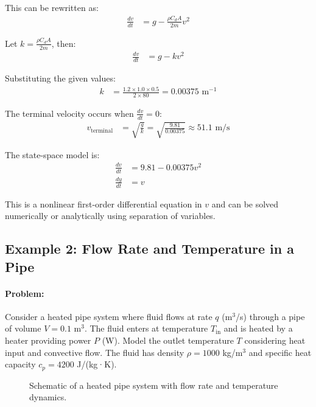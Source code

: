 \documentclass[11pt,a4paper]{article}
\begin{document}
This can be rewritten as:
\begin{align}
  \frac{dv}{dt} &= g - \frac{\rho C_d A}{2m} v^2
\end{align}

Let $k = \frac{\rho C_d A}{2m}$, then:
\begin{align}
  \frac{dv}{dt} &= g - kv^2
\end{align}

Substituting the given values:
\begin{align}
  k &= \frac{1.2 \times 1.0 \times 0.5}{2 \times 80} = 0.00375 \text{ m}^{-1}
\end{align}

The terminal velocity occurs when $\frac{dv}{dt} = 0$:
\begin{align}
  v_{\text{terminal}} &= \sqrt{\frac{g}{k}} = \sqrt{\frac{9.81}{0.00375}} \approx 51.1 \text{ m/s}
\end{align}

The state-space model is:
\begin{align}
  \frac{dv}{dt} &= 9.81 - 0.00375v^2 \\
  \frac{dy}{dt} &= v
\end{align}

This is a nonlinear first-order differential equation in $v$ and can be solved numerically or analytically using separation of variables.

\subsection{Example 2: Flow Rate and Temperature in a Pipe}

\paragraph{Problem:} Consider a heated pipe system where fluid flows at rate $q$ (m$^3$/s) through a pipe of volume $V = 0.1$ m$^3$. The fluid enters at temperature $T_{\text{in}}$ and is heated by a heater providing power $P$ (W). Model the outlet temperature $T$ considering heat input and convective flow. The fluid has density $\rho = 1000$ kg/m$^3$ and specific heat capacity $c_p = 4200$ J/(kg·K).

\begin{figure}[h]
  \centering
  \caption{Schematic of a heated pipe system with flow rate and temperature dynamics.}
\end{figure}
\end{document}
